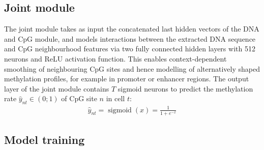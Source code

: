 \subsection{Joint module}

The joint module takes as input the concatenated last hidden vectors of the DNA and CpG module, and models interactions between the extracted DNA sequence and CpG neighbourhood features via two fully connected hidden layers with 512 neurons and ReLU activation function. This enables context-dependent smoothing of neighbouring CpG sites and hence modelling of alternatively shaped methylation profiles, for example in promoter or enhancer regions. The output layer of the joint module contains $T$ sigmoid neurons to predict the methylation rate $\hat{y}_{nt}\in(0;1)$ of CpG site $n$ in cell $t$:
\begin{align} \label{eq:dcpg_y}
  \hat{y}_{nt}=\operatorname{sigmoid}(x)=\frac{1}{1+e^{-x}}
\end{align}


\subsection{Model training}

